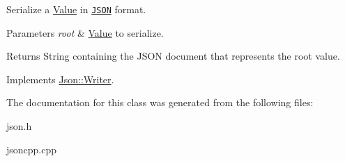 Serialize a \hyperlink{class_json_1_1_value}{Value} in \href{http://www.json.org}{\tt J\-S\-O\-N} format. 


\begin{DoxyParams}{Parameters}
{\em root} & \hyperlink{class_json_1_1_value}{Value} to serialize. \\
\hline
\end{DoxyParams}
\begin{DoxyReturn}{Returns}
String containing the J\-S\-O\-N document that represents the root value. 
\end{DoxyReturn}


Implements \hyperlink{class_json_1_1_writer}{Json\-::\-Writer}.



The documentation for this class was generated from the following files\-:\begin{DoxyCompactItemize}
\item 
json.\-h\item 
jsoncpp.\-cpp\end{DoxyCompactItemize}
